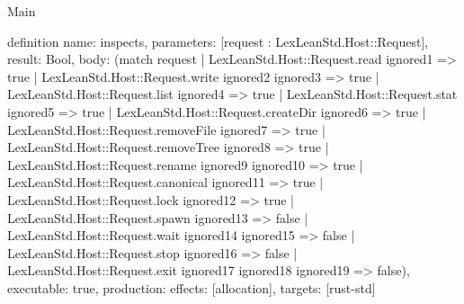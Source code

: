 \begin{lexlean}{Main}
\begin{semanticmodule}
definition{
  name: inspects,
  parameters: [request : LexLeanStd.Host::Request],
  result: Bool,
  body: (match request
    | LexLeanStd.Host::Request.read ignored1 => true
    | LexLeanStd.Host::Request.write ignored2 ignored3 => true
    | LexLeanStd.Host::Request.list ignored4 => true
    | LexLeanStd.Host::Request.stat ignored5 => true
    | LexLeanStd.Host::Request.createDir ignored6 => true
    | LexLeanStd.Host::Request.removeFile ignored7 => true
    | LexLeanStd.Host::Request.removeTree ignored8 => true
    | LexLeanStd.Host::Request.rename ignored9 ignored10 => true
    | LexLeanStd.Host::Request.canonical ignored11 => true
    | LexLeanStd.Host::Request.lock ignored12 => true
    | LexLeanStd.Host::Request.spawn ignored13 => false
    | LexLeanStd.Host::Request.wait ignored14 ignored15 => false
    | LexLeanStd.Host::Request.stop ignored16 => false
    | LexLeanStd.Host::Request.exit ignored17 ignored18 ignored19 => false),
  executable: true,
  production: {effects: [allocation], targets: [rust-std]}
}
\end{semanticmodule}
\end{lexlean}
